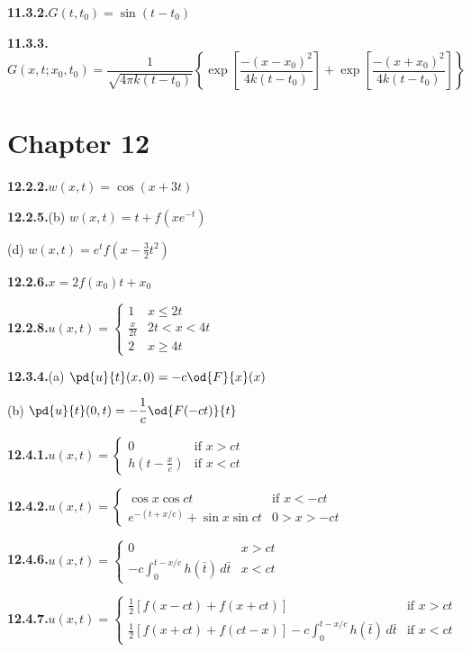\medskip
\textbf{11.3.2.}\quad $G(t,t_0) = \sin(t-t_0)$

\medskip
\textbf{11.3.3.}\quad $G(x,t;x_0,t_0) = \dfrac{1}{\sqrt{4\pi k(t-t_0)}}\left\{\exp\left[\dfrac{-(x-x_0)^2}{4k(t-t_0)}\right]+\exp\left[\dfrac{-(x+x_0)^2}{4k(t-t_0)}\right]\right\}$

\section*{Chapter 12}

\textbf{12.2.2.}\quad $w(x,t) = \cos(x+3t)$

\medskip
\textbf{12.2.5.}\quad (b) $w(x,t) = t + f(xe^{-t})$

\quad (d) $w(x,t) = e^t f(x-\frac{3}{2}t^2)$

\medskip
\textbf{12.2.6.}\quad $x = 2f(x_0)t + x_0$

\medskip
\textbf{12.2.8.}\quad $u(x,t) = \begin{cases} 1 & x \leq 2t \\ \frac{x}{2t} & 2t < x < 4t \\ 2 & x \geq 4t \end{cases}$

\medskip
\textbf{12.3.4.}\quad (a) $\pd{u}{t}(x,0) = -c\od{F}{x}(x)$

\quad (b) $\pd{u}{t}(0,t) = -\dfrac{1}{c}\od{F(-ct)}{t}$%

\medskip
\textbf{12.4.1.}\quad $u(x,t) = \begin{cases} 0 & \text{if } x > ct \\ h\left(t - \frac{x}{c}\right) & \text{if } x < ct \end{cases}$

\medskip
\textbf{12.4.2.}\quad $u(x,t) = \begin{cases} \cos x\cos ct & \text{if } x < -ct \\ e^{-(t+x/c)} + \sin x\sin ct & 0 > x > -ct \end{cases}$

\medskip
\textbf{12.4.6.}\quad $u(x,t) = \begin{cases} 0 & x > ct \\ -c\int_0^{t-x/c}h(\bar{t})\,d\bar{t} & x < ct \end{cases}$

\medskip
\textbf{12.4.7.}\quad $u(x,t) = \begin{cases} \frac{1}{2}[f(x-ct)+f(x+ct)] & \text{if } x > ct \\ \frac{1}{2}[f(x+ct)+f(ct-x)] - c\int_0^{t-x/c}h(\bar{t})\,d\bar{t} & \text{if } x < ct \end{cases}$

